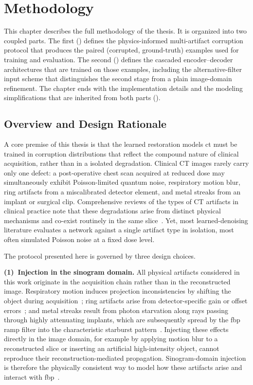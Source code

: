 \chapter{Methodology}
\label{chap:methodology}

This chapter describes the full methodology of the thesis. It is organized into two coupled parts. The first
() defines the physics-informed multi-artifact corruption protocol
that produces the paired (corrupted, ground-truth) examples used for training and evaluation. The second
() defines the cascaded encoder--decoder architectures that are trained on those examples, including the alternative-filter input scheme that distinguishes the second stage from a plain image-domain
refinement. The chapter ends with the implementation details and the modeling simplifications that are inherited from
both parts ().

\section{Overview and Design Rationale}
\label{sec:meth_overview}
\label{chap:corruption}%

A core premise of this thesis is that the learned restoration models \gls{ct} must be trained in corruption distributions that reflect the compound nature of clinical acquisition, rather than in a isolated degradation. Clinical CT images
rarely carry only one defect: a post-operative chest scan acquired at reduced dose may simultaneously exhibit
Poisson-limited quantum noise, respiratory motion blur, ring artifacts from a miscalibrated detector element, and metal
streaks from an implant or surgical clip. Comprehensive reviews of the types of CT artifacts in clinical practice note that these degradations arise from distinct physical mechanisms and co-exist routinely in the same
slice~\cite{Boas2012, Gjesteby2016}. Yet, most learned-denoising literature evaluates a network against a single artifact
type in isolation, most often simulated Poisson noise at a fixed dose level.

The protocol presented here is governed by three design choices.

\textbf{(1)~Injection in the sinogram domain.} All physical artifacts considered in this work originate in the acquisition chain rather than in the reconstructed image. Respiratory motion induces projection inconsistencies by shifting the object during acquisition~\cite{LuMackie2002, Mao2007}; ring artifacts arise from detector-specific gain or offset errors~\cite{Sijbers2004, Prell2009}; and metal streaks result from photon starvation along rays passing through highly attenuating implants, which are subsequently spread by the \gls{fbp} ramp filter into the characteristic starburst pattern~\cite{Gjesteby2016}. Injecting these effects directly in the image domain, for example by applying motion blur to a reconstructed slice or inserting an artificial high-intensity object, cannot reproduce their reconstruction-mediated propagation. Sinogram-domain injection is therefore the physically consistent way to model how these artifacts arise and interact with \gls{fbp}~\cite{Mao2007}.

